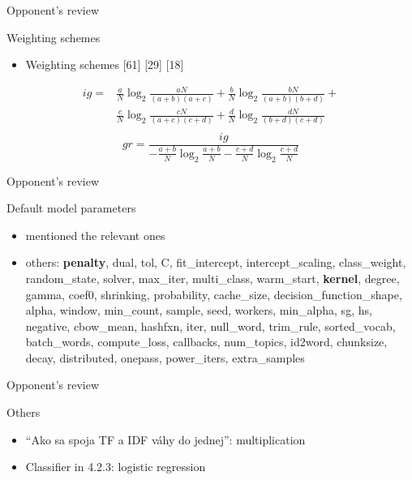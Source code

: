 \documentclass[xcolor={table}]{beamer}
\begin{document}
\begin{frame}{Opponent's review}
    \begin{block}{Weighting schemes}
        \begin{itemize}   
            \item Weighting  schemes [61] [29] [18]
        \end{itemize}
    \end{block}
    
    \begin{align*}
        ig = &\frac{a}{N}\log_2{\frac{aN}{(a+b)(a+c)}} + \frac{b}{N}\log_2{\frac{bN}{(a+b)(b+d)}} + \\ &\frac{c}{N}\log_2{\frac{cN}{(a+c)(c+d)}} + \frac{d}{N}\log_2{\frac{dN}{(b+d)(c+d)}} \\
    \end{align*}
    $$gr=\frac{ig}{-\frac{a+b}{N}\log_2{\frac{a+b}{N}} - \frac{c+d}{N}\log_2{\frac{c+d}{N}}}$$
    
    
\end{frame} 

\begin{frame}{Opponent's review}
    \begin{block}{Default model parameters}
        \begin{itemize}   
            \item mentioned the relevant ones
            \item others: \textbf{penalty}, dual, tol, C, fit\_intercept, intercept\_scaling, class\_weight, random\_state, solver, max\_iter, multi\_class, warm\_start, \textbf{kernel}, degree, gamma, coef0, shrinking, probability, cache\_size, decision\_function\_shape, alpha, window, min\_count, sample, seed, workers, min\_alpha, sg, hs, negative, cbow\_mean, hashfxn, iter, null\_word, trim\_rule, sorted\_vocab, batch\_words, compute\_loss, callbacks, num\_topics, id2word, chunksize, decay, distributed, onepass, power\_iters, extra\_samples
        \end{itemize}
    \end{block}
\end{frame} 

\begin{frame}{Opponent's review}
    \begin{block}{Others}
        \begin{itemize}   
            \item ``Ako sa spoja TF a IDF váhy do jednej'': multiplication
            \item Classifier in 4.2.3: logistic regression %
        \end{itemize}
    \end{block}
\end{frame} 
\end{document}
